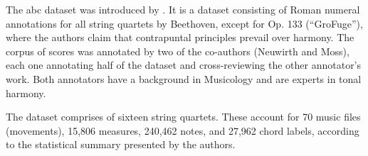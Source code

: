 
The \gls{abc} dataset was introduced by
\textcite{neuwirth2018annotated}. It is a dataset consisting
of Roman numeral annotations for all string quartets by
Beethoven, except for Op. 133 (``Gro\Se Fuge''), where the
authors claim that contrapuntal principles prevail over
harmony. The corpus of scores was annotated by two of the
co-authors (Neuwirth and Moss), each one annotating half of
the dataset and cross-reviewing the other annotator's work.
Both annotators have a background in Musicology and are
experts in tonal harmony.

The dataset comprises of sixteen string quartets. These
account for 70 music files (movements), 15,806 measures,
240,462 notes, and 27,962 chord labels, according to the
statistical summary presented by the authors.
